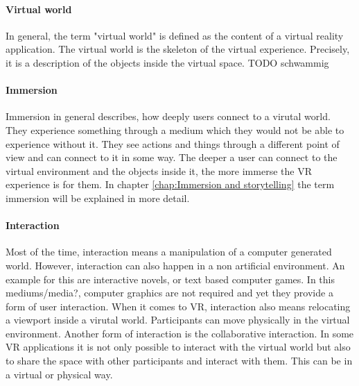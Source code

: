 \paragraph{Virtual world} In general, the term "virtual world" is defined as the content of a virtual reality application.  The virtual world is the skeleton of the virtual experience. Precisely, it is a description of the objects inside the virtual space. TODO schwammig

\paragraph{Immersion} Immersion in general describes, how deeply users connect to a virutal world. They experience something through a medium which they would not be able to experience without it. They see actions and things through a different point of view and can connect to it in some way. The deeper a user can connect to the virtual environment and the objects inside it, the more immerse the VR experience is for them. In chapter \ref{chap:Immersion and storytelling} the term immersion will be explained in more detail.

\paragraph{Interaction} Most of the time, interaction means a manipulation of a computer generated world. However, interaction can also happen in a non artificial environment. An example for this are interactive novels, or text based computer games. In this mediums/media?, computer graphics are not required and yet they provide a form of user interaction. When it comes to VR, interaction also means relocating a viewport inside a virutal world. Participants can move physically in the virtual environment. Another form of interaction is the collaborative interaction. In some VR applications it is not only possible to interact with the virtual world but also to share the space with other participants and interact with them. This can be in a virtual or physical way.
